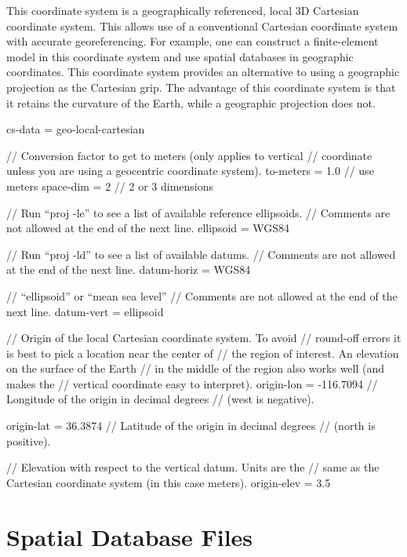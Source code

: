 This coordinate system is a geographically referenced, local 3D Cartesian
coordinate system. This allows use of a conventional Cartesian coordinate
system with accurate georeferencing. For example, one can construct
a finite-element model in this coordinate system and use spatial databases
in geographic coordinates. This coordinate system provides an alternative
to using a geographic projection as the Cartesian grip. The advantage
of this coordinate system is that it retains the curvature of the
Earth, while a geographic projection does not.
\begin{SimpleIOAscii}
cs-data = geo-local-cartesian {
  // Conversion factor to get to meters (only applies to vertical
  // coordinate unless you are using a geocentric coordinate system).
  to-meters = 1.0 // use meters
  space-dim = 2 // 2 or 3 dimensions

  // Run ``proj -le'' to see a list of available reference ellipsoids.
  // Comments are not allowed at the end of the next line.
  ellipsoid = WGS84

  // Run ``proj -ld'' to see a list of available datums.
  // Comments are not allowed at the end of the next line.
  datum-horiz = WGS84

  // ``ellipsoid'' or ``mean sea level''
  // Comments are not allowed at the end of the next line.
  datum-vert = ellipsoid

  // Origin of the local Cartesian coordinate system. To avoid
  // round-off errors it is best to pick a location near the center of
  // the region of interest. An elevation on the surface of the Earth
  // in the middle of the region also works well (and makes the
  // vertical coordinate easy to interpret).
  origin-lon = -116.7094 // Longitude of the origin in decimal degrees
                         // (west is negative).

  origin-lat = 36.3874 // Latitude of the origin in decimal degrees 
                       // (north is positive).

  // Elevation with respect to the vertical datum. Units are the
  // same as the Cartesian coordinate system (in this case meters).
  origin-elev = 3.5
}
\end{SimpleIOAscii}

\section{ Spatial Database Files}
\label{sec:format:SimpleGridDB}

